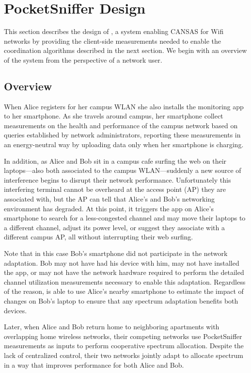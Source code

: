 \newpage
\section{PocketSniffer Design}
\label{sec-design}

This section describes the design of \PS{}, a system enabling CANSAS for Wifi
networks by providing the client-side measurements needed to enable the
coordination algorithms described in the next section. We begin with an
overview of the \PS{} system from the perspective of a network user.

\subsection{Overview}

When Alice registers for her campus WLAN she also installs the \PS{}
monitoring app to her smartphone. As she travels around campus, her
smartphone collect measurements on the health and performance of the campus
network based on queries established by network administrators, reporting
these measurements in an energy-neutral way by uploading data only when her
smartphone is charging.

In addition, as Alice and Bob sit in a campus cafe surfing the web on their
laptops---also both associated to the campus WLAN---suddenly a new source of
interference begins to disrupt their network performance. Unfortunately this
interfering terminal cannot be overheard at the access point (AP) they are
associated with, but the AP can tell that Alice's and Bob's networking
environment has degraded. At this point, it triggers the \PS{} app on Alice's
smartphone to search for a less-congested channel and may move their laptops
to a different channel, adjust its power level, or suggest they associate
with a different campus AP, all without interrupting their web surfing.

Note that in this case Bob's smartphone did not participate in the network
adaptation. Bob may not have had his device with him, may not have installed
the \PS{} app, or may not have the network hardware required to perform the
detailed channel utilization measurements necessary to enable this
adaptation. Regardless of the reason, \PS{} is able to use Alice's nearby
smartphone to estimate the impact of changes on Bob's laptop to ensure that
any spectrum adaptation benefits both devices.

Later, when Alice and Bob return home to neighboring apartments with
overlapping home wireless networks, their competing networks use
PocketSniffer measurements as inputs to perform cooperative spectrum
allocation. Despite the lack of centralized control, their two networks
jointly adapt to allocate spectrum in a way that improves performance for
both Alice and Bob.

